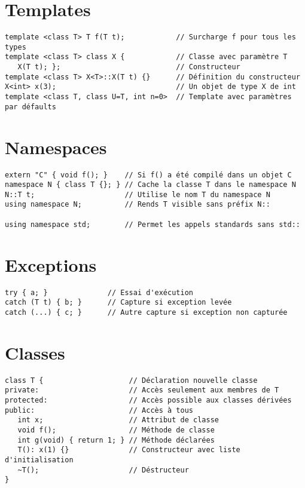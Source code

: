 \documentclass{article}
\begin{document}
\begin{multicols*}{3}
\section*{Templates}

\begin{lstlisting}
template <class T> T f(T t);            // Surcharge f pour tous les types
template <class T> class X {            // Classe avec paramètre T
   X(T t); };                           // Constructeur
template <class T> X<T>::X(T t) {}      // Définition du constructeur
X<int> x(3);                            // Un objet de type X de int
template <class T, class U=T, int n=0>  // Template avec paramètres par défaults
\end{lstlisting}

\section*{Namespaces}

\begin{lstlisting}
extern "C" { void f(); }    // Si f() a été compilé dans un objet C
namespace N { class T {}; } // Cache la classe T dans le namespace N
N::T t;                     // Utilise le nom T du namespace N
using namespace N;          // Rends T visible sans préfix N::

using namespace std;        // Permet les appels standards sans std::
\end{lstlisting}

\section*{Exceptions}

\begin{lstlisting}
try { a; }              // Essai d'exécution
catch (T t) { b; }      // Capture si exception levée
catch (...) { c; }      // Autre capture si exception non capturée
\end{lstlisting}

\section*{Classes}

\begin{lstlisting}
class T {                    // Déclaration nouvelle classe
private:                     // Accès seulement aux membres de T
protected:                   // Accès possible aux classes dérivées
public:                      // Accès à tous
   int x;                    // Attribut de classe
   void f();                 // Méthode de classe
   int g(void) { return 1; } // Méthode déclarées
   T(): x(1) {}              // Constructeur avec liste d'initialisation
   ~T();                     // Déstructeur
}


\end{lstlisting}
\end{multicols*}
\end{document}

